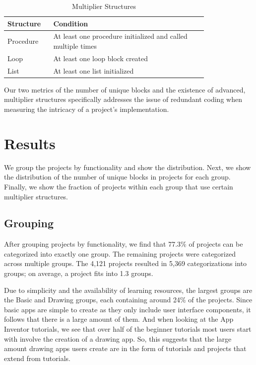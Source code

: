 \documentclass[conference]{IEEEtran}
\begin{document}
\begin{table}[h!]
\renewcommand{\arraystretch}{1.3}
\caption{Multiplier Structures}
\label{table_multiplier}
\centering
\begin{tabular}{| p{0.15\linewidth} | p{0.65\linewidth} | }
\hline
Structure & Condition \\
\hline \hline
Procedure & At least one procedure initialized and called multiple times\\
\hline
Loop & At least one loop block created\\ 
\hline
List & At least one list initialized\\
\hline

\end{tabular}
\end{table}

Our two metrics of the number of unique blocks and the existence of advanced, multiplier structures specifically addresses the issue of redundant coding when measuring the intricacy of a project's implementation.

\section{Results}
We group the projects by functionality and show the distribution. Next, we show the distribution of the number of unique blocks in projects for each group. Finally, we show the fraction of projects within each group that use certain multiplier structures.

\subsection{Grouping}
After grouping projects by functionality, we find that 77.3\% of projects can be categorized into exactly one group. The remaining projects were categorized across multiple groups. The 4,121 projects resulted in 5,369 categorizations into groups; on average, a project fits into 1.3 groups.

Due to simplicity and the availability of learning resources, the largest groups are the Basic and Drawing groups, each containing around 24\% of the projects. Since basic apps are simple to create as they only include user interface components, it follows that there is a large amount of them. And when looking at the App Inventor tutorials, we see that over half of the beginner tutorials most users start with involve the creation of a drawing app. So, this suggests that the large amount drawing apps users create are in the form of tutorials and projects that extend from tutorials.
\end{document}
